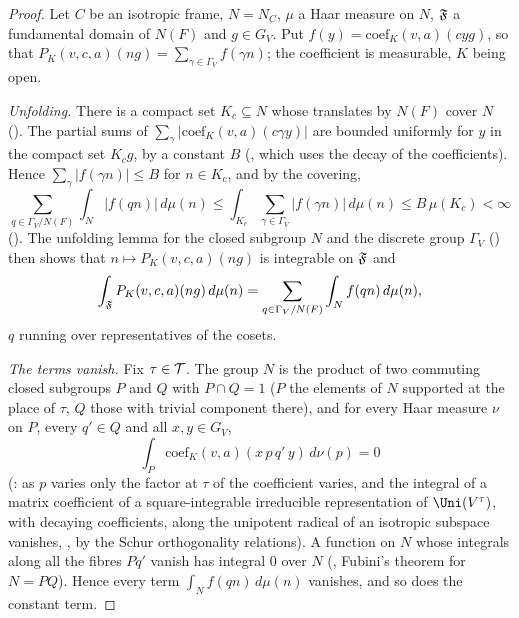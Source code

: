 \begin{proof}
Let $C$ be an isotropic frame, $N=N_C$, $\mu$ a Haar measure on $N$, $\mathfrak F$ a fundamental domain of $N(F)$ and $g\in G_V$. Put
$f(y)=\mathrm{coef}_K(v,a)(cyg)$, so that $P_K(v,c,a)(ng)=\sum_{\gamma\in\Gamma_V}f(\gamma n)$; the coefficient is measurable, $K$ being open.

\emph{Unfolding.} There is a compact set $K_c\subseteq N$ whose translates by $N(F)$ cover $N$
(). The partial sums of $\sum_\gamma|\mathrm{coef}_K(v,a)(c\gamma y)|$ are bounded
uniformly for $y$ in the compact set $K_cg$, by a constant $B$ (, which
uses the decay of the coefficients). Hence $\sum_\gamma|f(\gamma n)|\le B$ for $n\in K_c$, and by the covering,
\[
\sum_{q\in\Gamma_V/N(F)}\int_N|f(qn)|\,d\mu(n)\le\int_{K_c}\sum_{\gamma\in\Gamma_V}|f(\gamma n)|\,d\mu(n)\le B\,\mu(K_c)<\infty
\]
(). The unfolding lemma for the closed subgroup $N$ and the discrete group
$\Gamma_V$ () then shows that $n\mapsto P_K(v,c,a)(ng)$ is integrable on $\mathfrak F$ and
\[
\int_{\mathfrak F}P_K(v,c,a)(ng)\,d\mu(n)=\sum_{q\in\Gamma_V/N(F)}\int_Nf(qn)\,d\mu(n),
\]
$q$ running over representatives of the cosets.

\emph{The terms vanish.} Fix $\tau\in\mathcal T$. The group $N$ is the product of two commuting closed subgroups $P$ and $Q$ with $P\cap Q=1$ ($P$ the
elements of $N$ supported at the place of $\tau$, $Q$ those with trivial component there), and for every Haar measure $\nu$ on $P$, every
$q'\in Q$ and all $x,y\in G_V$,
\[
\int_P\mathrm{coef}_K(v,a)(x\,p\,q'\,y)\,d\nu(p)=0
\]
(: as $p$ varies only the factor at $\tau$ of the coefficient varies, and the integral of
a matrix coefficient of a square-integrable irreducible representation of $\Uni(V^\tau)$, with decaying coefficients, along the unipotent
radical of an isotropic subspace vanishes, , by the Schur orthogonality relations).
A function on $N$ whose integrals along all the fibres $Pq'$ vanish has integral $0$ over $N$
(, Fubini's theorem for $N=PQ$). Hence every term
$\int_Nf(qn)\,d\mu(n)$ vanishes, and so does the constant term.
\end{proof}

